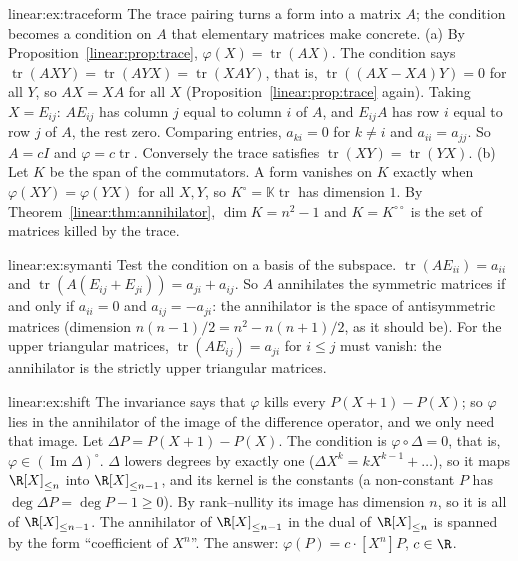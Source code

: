 \begin{solution}{linear:ex:traceform}
\idea The trace pairing turns a form into a matrix $A$; the condition becomes a condition on $A$ that elementary
matrices make concrete.
\writeup (a) By Proposition~\ref{linear:prop:trace}, $\varphi(X)=\operatorname{tr}(AX)$. The condition says
$\operatorname{tr}(AXY)=\operatorname{tr}(AYX)=\operatorname{tr}(XAY)$, that is, $\operatorname{tr}((AX-XA)Y)=0$ for all $Y$, so
$AX=XA$ for all $X$ (Proposition~\ref{linear:prop:trace} again). Taking $X=E_{ij}$: $AE_{ij}$ has column $j$ equal to column $i$ of
$A$, and $E_{ij}A$ has row $i$ equal to row $j$ of $A$, the rest zero. Comparing entries, $a_{ki}=0$ for $k\ne i$ and
$a_{ii}=a_{jj}$. So $A=cI$ and $\varphi=c\operatorname{tr}$. Conversely the trace satisfies $\operatorname{tr}(XY)=\operatorname{tr}(YX)$.
(b) Let $K$ be the span of the commutators. A form vanishes on $K$ exactly when $\varphi(XY)=\varphi(YX)$ for all $X,Y$, so
$K^\circ=\mathbb K\operatorname{tr}$ has dimension $1$. By Theorem~\ref{linear:thm:annihilator}, $\dim K=n^2-1$ and $K=K^{\circ\circ}$
is the set of matrices killed by the trace.
\end{solution}

\begin{solution}{linear:ex:symanti}
\idea Test the condition on a basis of the subspace.
\writeup $\operatorname{tr}(AE_{ii})=a_{ii}$ and $\operatorname{tr}(A(E_{ij}+E_{ji}))=a_{ji}+a_{ij}$. So $A$ annihilates the
symmetric matrices if and only if $a_{ii}=0$ and $a_{ij}=-a_{ji}$: the annihilator is the space of antisymmetric
matrices (dimension $n(n-1)/2=n^2-n(n+1)/2$, as it should be). For the upper triangular matrices,
$\operatorname{tr}(AE_{ij})=a_{ji}$ for $i\le j$ must vanish: the annihilator is the strictly upper triangular matrices.
\end{solution}

\begin{solution}{linear:ex:shift}
\idea The invariance says that $\varphi$ kills every $P(X+1)-P(X)$; so $\varphi$ lies in the annihilator of the image of
the difference operator, and we only need that image.
\writeup Let $\Delta P=P(X+1)-P(X)$. The condition is $\varphi\circ\Delta=0$, that is, $\varphi\in(\operatorname{Im}\Delta)^\circ$.
$\Delta$ lowers degrees by exactly one ($\Delta X^k=kX^{k-1}+\dots$), so it maps $\R[X]_{\le n}$ into $\R[X]_{\le n-1}$, and
its kernel is the constants (a non-constant $P$ has $\deg\Delta P=\deg P-1\ge0$). By rank--nullity its image has dimension
$n$, so it is all of $\R[X]_{\le n-1}$. The annihilator of $\R[X]_{\le n-1}$ in the dual of $\R[X]_{\le n}$ is spanned by
the form ``coefficient of $X^n$''. The answer: $\varphi(P)=c\cdot[X^n]P$, $c\in\R$.
\end{solution}

